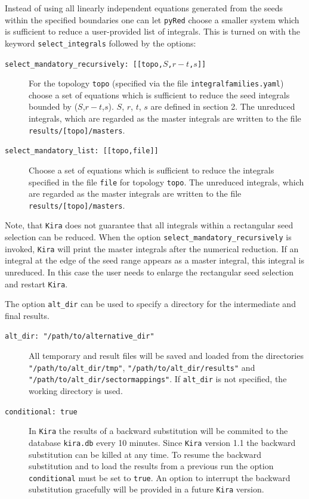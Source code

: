 \documentclass[a4paper,12pt]{scrartcl}
\newcommand*{\kira}{\texttt{Kira}}
\newcommand*{\pyred}{\texttt{pyRed}}
\begin{document}
Instead of using all linearly independent equations
generated from the seeds within the specified boundaries one can let \pyred{} choose a smaller system which is sufficient to reduce a user-provided list of integrals. This is turned on with the keyword
\texttt{select\_integrals}
followed by the options:
\begin{description}
\item[\texttt{select\_mandatory\_recursively: [[topo,$S$,$r-t$,$s$]]}]
  For the topology \texttt{topo}
  (specified via the file \texttt{integralfamilies.yaml}) choose a set of equations
  which is sufficient to reduce
  the seed integrals bounded by ($S$,$r-t$,$s$). $S$,
  $r$, $t$, $s$ are defined in section 2. The unreduced
  integrals, which are regarded as the master integrals are written to the file
  \texttt{results/[topo]/masters}.
\item[\texttt{select\_mandatory\_list: [[topo,file]]}]
  Choose a set of equations which is sufficient to reduce
  the integrals specified in the file \texttt{file} for topology \texttt{topo}.
  The unreduced integrals, which are regarded as the master integrals are written to the file\\
  \texttt{results/[topo]/masters}.
\end{description}
Note, that \kira{} does not guarantee that all integrals within a rectangular seed selection can be reduced. When the option \texttt{select\_mandatory\_recursively} is invoked, \kira{} will print the master integrals after the numerical reduction. If an integral at the edge of the seed range appears as a master integral, this integral is unreduced. In this case the user needs to enlarge the rectangular seed selection and restart \kira{}.

The option \texttt{alt\_dir} can be used to specify a directory for the
intermediate and final results.
\begin{description}
\item[\texttt{alt\_dir: "/path/to/alternative\_dir"}]
  All temporary and result files will be saved and loaded from the directories\\
  \texttt{"/path/to/alt\_dir/tmp"}, \texttt{"/path/to/alt\_dir/results"} and \\
  \texttt{"/path/to/alt\_dir/sectormappings"}.
  If \texttt{alt\_dir} is not specified, the working directory is used.
\end{description}
\begin{description}
\item[\texttt{conditional: true}] In \kira{} the results of a backward substitution will be commited to the database \texttt{kira.db} every 10 minutes. Since \kira{} version 1.1 the backward substitution can be killed at any time. To resume the backward substitution and to load the results from a previous run the option \texttt{conditional} must be set to \texttt{true}. An option to interrupt the backward substitution gracefully will be provided in a future \kira{} version.
\end{description}
\end{document}
